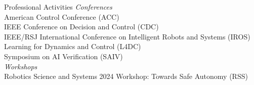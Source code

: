\begin{rSection}{Professional Activities}
    \textit{Conferences}\\
    American Control Conference (ACC)\\
    IEEE Conference on Decision and Control (CDC)\\
    IEEE/RSJ International Conference on Intelligent Robots and Systems (IROS)\\
    Learning for Dynamics and Control (L4DC)\\
    Symposium on AI Verification (SAIV)\\

    \textit{Workshops}\\
    Robotics Science and Systems 2024 Workshop: Towards Safe Autonomy (RSS)

\end{rSection}